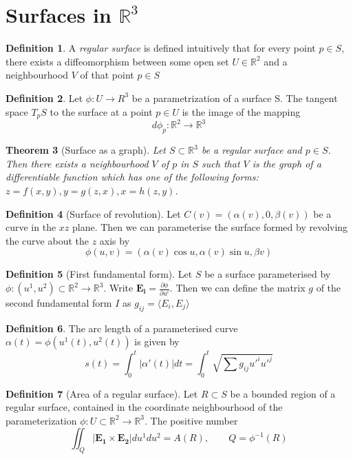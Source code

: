 \documentclass[10pt, oneside, reqno]{amsart}
\newcommand{\R}{\mathbb{R}}
\theoremstyle{plain}%
\newtheorem{thm}{Theorem}[section]
\theoremstyle{definition}
\newtheorem{defn}[thm]{Definition}
\theoremstyle{remark}
\begin{document}
\section{Surfaces in $\R^3$}



\begin{defn}
	A \emph{regular surface} is defined intuitively that for every point $p \in S$, there exists a diffeomorphism between some open set $U \in \R^2$ and a neighbourhood $V$ of that point $p \in S$
\end{defn}

\begin{defn}
	Let $\phi: U \rightarrow R^3$ be a parametrization of a surface S.  The tangent space $T_p S$ to the surface at a point $p \in U$ is the image of the mapping \[
		d\phi_p : \R^2 \rightarrow \R^3
	\]
\end{defn}
\begin{thm}[Surface as a graph]
	Let $S \subset \R^3$ be a regular surface and $p \in S$.  Then there exists a neighbourhood $V$ of $p$ in $S$ such that $V$ is the graph of a differentiable function which has one of the following forms: $z = f(x,y), y = g(z,x), x = h(z,y)$.
\end{thm}


\begin{defn}[Surface of revolution]
	Let $C(v) = (\alpha(v),0,\beta(v))$ be a curve in the $xz$ plane.  Then we can parameterise the surface formed by revolving the curve about the $z$ axis by \[
		\phi(u,v) = (\alpha(v)\cos u, \alpha(v) \sin u,\beta v )
	\]
\end{defn}
\begin{defn}[First fundamental form]
	Let $S$ be a surface parameterised by $\phi : (u^1,u^2) \subset \R^2 \rightarrow \R^3$.  Write $\mathbf{E_i} = \frac{\partial \phi}{\partial u^i}$.  Then we can define the matrix $g$ of the second fundamental form $I$  as $g_{ij} = \langle E_i,E_j \rangle$
\end{defn}

\begin{defn}
	The arc length of a parameterised curve $\alpha(t) = \phi(u^1(t),u^2(t))$ is given by \[
		s(t) = \int_0^t |\alpha'(t)| dt = \int_0^t \sqrt{\sum g_{ij} u'^i u'^j }
			\]
\end{defn}

\begin{defn}[Area of a regular surface]
	Let $R \subset S$ be a bounded region of a regular surface, contained in the coordinate neighbourhood of the parameterization $\phi: U \subset \R^2 \rightarrow \R^3$.  The positive number \[
		\iint_Q |\mathbf{E_1} \times \mathbf{E_2} | du^1 du^2 = A(R), \qquad Q = \phi^{-1}(R) 
	\]
\end{defn}
\end{document}
